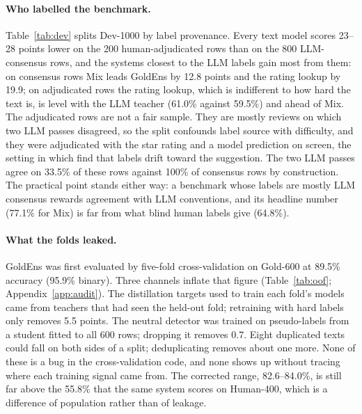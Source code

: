 \paragraph{Who labelled the benchmark.}
Table~\ref{tab:dev} splits Dev-1000 by label provenance. Every text
model scores 23--28 points lower on the 200 human-adjudicated rows
than on the 800 LLM-consensus rows, and the systems closest to the
LLM labels gain most from them: on consensus rows Mix leads GoldEns
by 12.8 points and the rating lookup by 19.9; on adjudicated rows the
rating lookup, which is indifferent to how hard the text is, is level
with the LLM teacher (61.0\% against 59.5\%) and ahead of Mix. The adjudicated rows are not a fair sample. They are mostly
reviews on which two LLM passes disagreed, so the split confounds
label source with difficulty, and they were adjudicated with the star
rating and a model prediction on screen, the setting in which
\citet{schroeder2025humanloop} find that labels drift toward the
suggestion. The two LLM passes agree on 33.5\% of these rows against
100\% of consensus rows by construction. The practical point stands
either way: a benchmark whose labels are mostly LLM consensus rewards
agreement with LLM conventions, and its headline number (77.1\% for
Mix) is far from what blind human labels give (64.8\%).

\paragraph{What the folds leaked.}
GoldEns was first evaluated by five-fold cross-validation on Gold-600
at 89.5\% accuracy (95.9\% binary). Three channels inflate that
figure (Table~\ref{tab:oof}; Appendix~\ref{app:audit}). The
distillation targets used to train each fold's models came from
teachers that had seen the held-out fold; retraining with hard labels
only removes 5.5 points. The neutral detector was trained on
pseudo-labels from a student fitted to all 600 rows; dropping it
removes 0.7. Eight duplicated texts could fall on both sides of a
split; deduplicating removes about one more. None of these is a bug
in the cross-validation code, and none shows up without tracing
where each training signal came from. The corrected range,
82.6--84.0\%, is still far above the 55.8\% that the same system
scores on Human-400, which is a difference of population rather than
of leakage.

